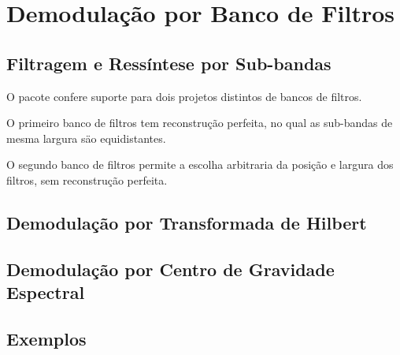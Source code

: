 \section{Demodulação por Banco de Filtros}
\subsection{Filtragem e Ressíntese por Sub-bandas}

O pacote confere suporte para dois projetos distintos de bancos de filtros.

O primeiro banco de filtros tem reconstrução perfeita, no qual as sub-bandas
de mesma largura säo equidistantes.

O segundo banco de filtros permite a escolha
arbitraria da posição e largura dos filtros, sem reconstrução perfeita. 


\subsection{Demodulação por Transformada de Hilbert}
\subsection{Demodulação por Centro de Gravidade Espectral}
\subsection{Exemplos}